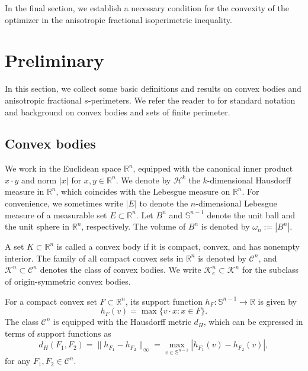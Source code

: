 \documentclass[12pt, oneside,reqno]{amsart}
\numberwithin{equation}{section}
\newtheorem{theorem}{Theorem}[section]
\newtheorem{definition and theorem}[theorem]{Definition and Theorem}
\newcommand{\tA}{\mathcal{A}_s}
\theoremstyle{plain}
\theoremstyle{remark}
\theoremstyle{definition}
\newcommand{\sn}{{\mathbb S}^{n-1}}
\newcommand{\rn}{\mathbb R^n}
\newcommand{\tk}{\mathcal{K}}
\newcommand{\tH}{\mathcal{H}}
\begin{document}
In the final section, we establish a necessary condition for the convexity of the optimizer in the anisotropic fractional isoperimetric inequality.



\section{Preliminary}
In this section, we collect some basic definitions and results on convex bodies and anisotropic fractional $s$-perimeters. We refer the reader to \cite{Gar,Maggi, Sch} for standard notation and background on convex bodies and sets of finite perimeter.

\subsection{Convex bodies}
We work in the Euclidean space $\rn$, equipped with the canonical inner product $x\cdot y$ and norm $|x|$ for $x,y\in\rn$. We denote by $\tH^k$ the $k$-dimensional Hausdorff measure in $\rn$, which coincides with the Lebesgue measure on $\rn$. For convenience, we sometimes write $|E|$ to denote the $n$-dimensional Lebesgue measure of a measurable set $E\subset \rn$. Let $B^n$ and $\sn$ denote the unit ball and the unit sphere in $\rn$, respectively. The volume of $B^n$ is denoted by $\omega_n:=|B^n|$.

A set $K \subset \mathbb{R}^n$ is called a convex body if it is compact, convex, and has nonempty interior. 
The family of all compact convex sets in $\rn$ is denoted by $\mathcal{C}^n$, 
and $\mathcal{K}^n \subset \mathcal{C}^n$ denotes the class of convex bodies. 
We write $\mathcal{K}_e^n \subset \mathcal{K}^n$ for the subclass of origin-symmetric convex bodies.


For a compact convex set $F \subset \mathbb{R}^n$, its support function $h_F : \mathbb{S}^{n-1} \to \mathbb{R}$ is given by
\[
h_F(v) = \max\{  v\cdot x  : x \in F \}.
\]
The class $\mathcal{C}^n$ is equipped with the Hausdorff metric $d_H$, which can be expressed in terms of support functions as
\[
d_H(F_1, F_2) = \| h_{F_1} - h_{F_2} \|_\infty = \max_{v \in \sn} |h_{F
_1}(v) - h_{F_2}(v)|,
\]
for any $F_1, F_2 \in\mathcal{C}^n$.
\end{document}
